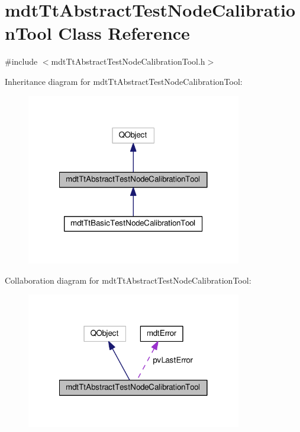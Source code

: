 \hypertarget{classmdt_tt_abstract_test_node_calibration_tool}{\section{mdt\-Tt\-Abstract\-Test\-Node\-Calibration\-Tool Class Reference}
\label{classmdt_tt_abstract_test_node_calibration_tool}
}


{\ttfamily \#include $<$mdt\-Tt\-Abstract\-Test\-Node\-Calibration\-Tool.\-h$>$}



Inheritance diagram for mdt\-Tt\-Abstract\-Test\-Node\-Calibration\-Tool\-:
\nopagebreak
\begin{figure}[H]
\begin{center}
\leavevmode
\includegraphics[width=266pt]{classmdt_tt_abstract_test_node_calibration_tool__inherit__graph}
\end{center}
\end{figure}


Collaboration diagram for mdt\-Tt\-Abstract\-Test\-Node\-Calibration\-Tool\-:
\nopagebreak
\begin{figure}[H]
\begin{center}
\leavevmode
\includegraphics[width=266pt]{classmdt_tt_abstract_test_node_calibration_tool__coll__graph}
\end{center}
\end{figure}
